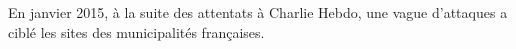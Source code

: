 En janvier 2015, à la suite des attentats à Charlie Hebdo, une vague d'attaques a ciblé les sites des municipalités françaises.\cite{courrier}
